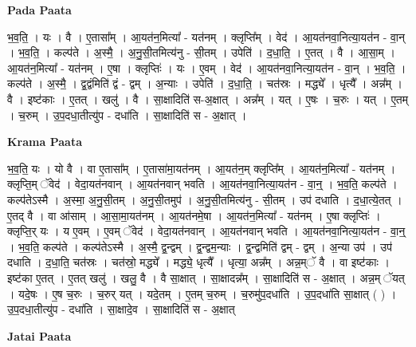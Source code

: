 \documentclass[17pt]{extarticle}
\begin{document}
\textbf{Pada Paata} \newline

भ॒व॒ति॒ । यः । वै । ए॒तासा᳚म् । आ॒यत॑न॒मित्या᳚ - यत॑नम् । क्लृप्ति᳚म् । वेद॑ । आ॒यत॑नवा॒नित्या॒यत॑न - वा॒न् । भ॒व॒ति॒ । कल्प॑ते । अ॒स्मै॒ । अ॒नु॒सी॒तमित्य॑नु - सी॒तम् । उपेति॑ । द॒धा॒ति॒ । ए॒तत् । वै । आ॒सा॒म् । आ॒यत॑न॒मित्या᳚ - यत॑नम् । ए॒षा । क्लृप्तिः॑ । यः । ए॒वम् । वेद॑ । आ॒यत॑नवा॒नित्या॒यत॑न - वा॒न् । भ॒व॒ति॒ । कल्प॑ते । अ॒स्मै॒ । द्व॒द्वंमिति॑ द्वं - द्वम् । अ॒न्याः । उपेति॑ । द॒धा॒ति॒ । चत॑स्रः । मद्ध्ये᳚ । धृत्यै᳚ । अन्न᳚म् । वै । इष्ट॑काः । ए॒तत् । खलु॑ । वै । सा॒क्षादिति॑ स-अ॒क्षात् । अन्न᳚म् । यत् । ए॒षः । च॒रुः । यत् । ए॒तम् । च॒रुम् । उ॒प॒दधा॒तीत्यु॑प - दधा॑ति । सा॒क्षादिति॑ स - अ॒क्षात् ।  \newline


\textbf{Krama Paata} \newline

भ॒व॒ति॒ यः । यो वै । वा ए॒तासा᳚म् । ए॒तासा॑मा॒यत॑नम् । आ॒यत॑न॒म् क्लृप्ति᳚म् । आ॒यत॑न॒मित्या᳚ - यत॑नम् । क्लृप्ति॒म् ॅवेद॑ । वेदा॒यत॑नवान् । आ॒यत॑नवान् भवति । आ॒यत॑नवा॒नित्या॒यत॑न - वा॒न्॒ । भ॒व॒ति॒ कल्प॑ते । कल्प॑तेऽस्मै । अ॒स्मा॒ अ॒नु॒सी॒तम् । अ॒नु॒सी॒तमुप॑ । अ॒नु॒सी॒तमित्य॑नु - सी॒तम् । उप॑ दधाति । द॒धा॒त्ये॒तत् । ए॒तद् वै । वा आ॑साम् । आ॒सा॒मा॒यत॑नम् । आ॒यत॑नमे॒षा । आ॒यत॑न॒मित्या᳚ - यत॑नम् । ए॒षा क्लृप्तिः॑ । क्लृप्ति॒र् यः । य ए॒वम् । ए॒वम् ॅवेद॑ । वेदा॒यत॑नवान् । आ॒यत॑नवान् भवति । आ॒यत॑नवा॒नित्या॒यत॑न - वा॒न्॒ । भ॒व॒ति॒ कल्प॑ते । कल्प॑तेऽस्मै । अ॒स्मै॒ द्व॒न्द्वम् । द्व॒न्द्वम॒न्याः । द्व॒न्द्वमिति॑ द्वम् - द्वम् । अ॒न्या उप॑ । उप॑ दधाति । द॒धा॒ति॒ चत॑स्रः । चत॑स्रो॒ मद्ध्ये᳚ । मद्ध्ये॒ धृत्यै᳚ । धृत्या॒ अन्न᳚म् । अन्न॒म्ॅ वै । वा इष्ट॑काः । इष्ट॑का ए॒तत् । ए॒तत् खलु॑ । खलु॒ वै । वै सा॒क्षात् । सा॒क्षादन्न᳚म् । सा॒क्षादिति॑ स - अ॒क्षात् । अन्न॒म् ॅयत् । यदे॒षः । ए॒ष च॒रुः । च॒रुर् यत् । यदे॒तम् । ए॒तम् च॒रुम् । च॒रुमु॑प॒दधा॑ति । उ॒प॒दधा॑ति सा॒क्षात् ( ) । उ॒प॒दधा॒तीत्यु॑प - दधा॑ति । सा॒क्षादे॒व । सा॒क्षादिति॑ स - अ॒क्षात् \newline

\textbf{Jatai Paata} \newline
\end{document}
